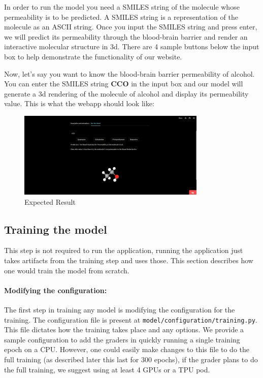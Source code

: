 \documentclass[fontsize=11pt]{article}
\begin{document}
In order to run the model you need a SMILES string of the molecule whose permeability is to be predicted. A SMILES string is a representation of the molecule as an ASCII string. Once you input the SMILES string and press enter, we will predict its permeability through the blood-brain barrier and render an interactive molecular structure in 3d. There are 4 sample buttons below the input box to help demonstrate the functionality of our website.

Now, let's say you want to know the blood-brain barrier permeability of alcohol. You can enter the SMILES string \textbf{CCO} in the input box and our model will generate a 3d rendering of the molecule of alcohol and display its permeability value. This is what the webapp should look like:

\begin{figure}[ht]
    \centering
    \includegraphics[width=0.8\textwidth]{webapp3.png}
    \caption{Expected Result}
    \label{fig:visualizeaugmentations}
\end{figure}

\subsection*{Training the model}

This step is not required to run the application, running the application just takes artifacts from the training step and uses those. This section describes how one would train the model from scratch.

\paragraph{Modifying the configuration:} The first step in training any model is modifying the configuration for the training. The configuration file is present at \texttt{model/configuration/training.py}. This file dictates how the training takes place and any options. We provide a sample configuration to add the graders in quickly running a single training epoch on a CPU. However, one could easily make changes to this file to do the full training (as described later this last for $300$ epochs), if the grader plans to do the full training, we suggest using at least 4 GPUs or a TPU pod.
\end{document}
